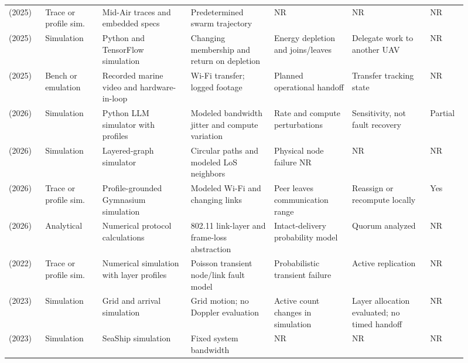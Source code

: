 \begin{longtable}{@{}Y{0.075\linewidth}Y{0.116\linewidth}Y{0.17\linewidth}Y{0.163\linewidth}Y{0.156\linewidth}Y{0.153\linewidth}Y{0.077\linewidth}@{}}
\cite{R0059}\newline\mbox{(2025)} & Trace or profile sim. & Mid-Air traces and embedded specs & Predetermined swarm trajectory & NR & NR & NR \\
\cite{R0068}\newline\mbox{(2025)} & Simulation & Python and TensorFlow simulation & Changing membership and return on depletion & Energy depletion and joins\allowbreak{}/leaves & Delegate work to another UAV & NR \\
\cite{R0292}\newline\mbox{(2025)} & Bench or emulation & Recorded marine video and hardware-in-loop & Wi-Fi transfer; logged footage & Planned operational handoff & Transfer tracking state & NR \\
\cite{R0074}\newline\mbox{(2026)} & Simulation & Python LLM simulator with profiles & Modeled bandwidth jitter and compute variation & Rate and compute perturbations & Sensitivity, not fault recovery & Partial \\
\cite{R0077}\newline\mbox{(2026)} & Simulation & Layered-graph simulator & Circular paths and modeled LoS neighbors & Physical node failure NR & NR & NR \\
\cite{R0092}\newline\mbox{(2026)} & Trace or profile sim. & Profile-grounded Gymnasium simulation & Modeled Wi-Fi and changing links & Peer leaves communication range & Reassign or recompute locally & Yes \\
\cite{R0121}\newline\mbox{(2026)} & Analytical & Numerical protocol calculations & 802.11 link-layer and frame-loss abstraction & Intact-delivery probability model & Quorum analyzed & NR \\
\cite{R0029}\newline\mbox{(2022)} & Trace or profile sim. & Numerical simulation with layer profiles & Poisson transient node\allowbreak{}/link fault model & Probabilistic transient failure & Active replication & NR \\
\cite{R0019}\newline\mbox{(2023)} & Simulation & Grid and arrival simulation & Grid motion; no Doppler evaluation & Active count changes in simulation & Layer allocation evaluated; no timed handoff & NR \\
\cite{R0043}\newline\mbox{(2023)} & Simulation & SeaShip simulation & Fixed system bandwidth & NR & NR & NR \\

\end{longtable}
